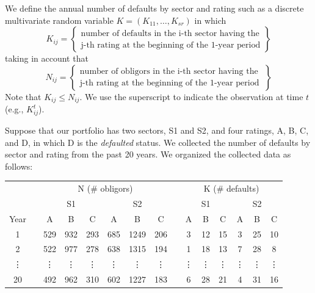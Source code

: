 \documentclass[11pt,fleqn]{book} %
\begin{document}
\begin{definition}
	We define the annual number of defaults by sector and rating such as a
	discrete multivariate random variable $K=(K_{11}, \dots, K_{sr})$ in which
	\begin{displaymath}
		K_{ij} = \left\{
		\begin{array}{c}
			\text{number of defaults in the i-th sector having the} \\
			\text{j-th rating at the beginning of the 1-year period}
		\end{array}
		\right\}
	\end{displaymath}
	taking in account that
	\begin{displaymath}
		N_{ij} = \left\{
		\begin{array}{c}
			\text{number of obligors in the i-th sector having the } \\
			\text{j-th rating at the beginning of the 1-year period}
		\end{array}
		\right\}
	\end{displaymath}
	Note that $K_{ij} \le N_{ij}$. We use the superscript to indicate 
	the observation at time $t$ (e.g., $K_{ij}^t$).
\end{definition}

\begin{example}[]
	Suppose that our portfolio has two sectors, S1 and S2, and four ratings, 
	A, B, C, and D, in which D is the \emph{defaulted} status. We collected 
	the number of defaults by sector and rating from the past 20 years. We 
	organized the collected data as follows:

	\centering
	\begin{tabular}{cc|c|c|c||c|c|c|  c  |c|c|c||c|c|c|}
		\cline{3-8} \cline{10-15}
		& & \multicolumn{6}{|c|}{N (\# obligors)} & & \multicolumn{6}{|c|}{K (\# defaults)} \\
		\cline{3-8} \cline{10-15}
		& & \multicolumn{3}{|c||}{S1} & \multicolumn{3}{|c|}{S2} & & \multicolumn{3}{|c||}{S1} & \multicolumn{3}{|c|}{S2} \\
		\cline{1-1} \cline{3-8} \cline{10-15}
		\multicolumn{1}{|c|}{Year} & & A & B & C & A & B & C & & A & B & C & A & B & C \\
		\cline{1-1} \cline{3-8} \cline{10-15}
		\multicolumn{1}{|c|}{1} & & 529 & 932 & 293 & 685 & 1249 & 206 & & 3 & 12 & 15 & 3 & 25 & 10 \\
		\cline{1-1} \cline{3-8} \cline{10-15}
		\multicolumn{1}{|c|}{2} & & 522 & 977 & 278 & 638 & 1315 & 194 & & 1 & 18 & 13 & 7 & 28 & 8 \\
		\cline{1-1} \cline{3-8} \cline{10-15}
		\multicolumn{1}{|c|}{\vdots} & & \vdots & \vdots & \vdots & \vdots & \vdots & \vdots & & \vdots & \vdots & \vdots & \vdots & \vdots & \vdots \\
		\cline{1-1} \cline{3-8} \cline{10-15}
		\multicolumn{1}{|c|}{20} & & 492 & 962 & 310 & 602 & 1227 & 183 & & 6 & 28 & 21 & 4 & 31 & 16 \\
		\cline{1-1} \cline{3-8} \cline{10-15}
	\end{tabular}
\end{example}
\end{document}
